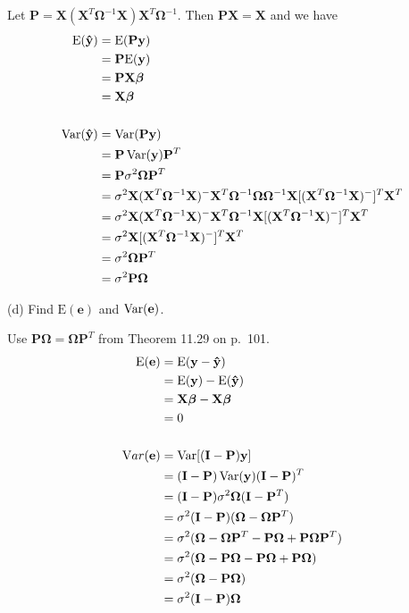 \bigskip
\noindent
Let $\mathbf P=\mathbf X(\mathbf X^T\bm\Omega^{-1}\mathbf X)\mathbf X^T
\bm\Omega^{-1}$.
Then $\mathbf{PX}=\mathbf X$ and we have
%
\begin{align*}
\mathrm E(\mathbf{\hat y})
&=\mathrm E(\mathbf{Py})\\
&=\mathbf P\mathrm E(\mathbf y)\\
&=\mathbf{PX}\bm\beta\\
&=\mathbf X\bm\beta\\
\\
\mathop{\rm Var}(\mathbf{\hat y})
&=\mathop{\rm Var}(\mathbf{Py})\\
&=\mathbf P\mathop{\rm Var}(\mathbf y)\mathbf P^T\\
&=\mathbf P\sigma^2\bm\Omega\mathbf P^T\\
&=\sigma^2\mathbf X(\mathbf X^T\bm\Omega^{-1}\mathbf X)^{-{}}
\mathbf X^T\bm\Omega^{-1}\bm\Omega\bm\Omega^{-1}
\mathbf X[(\mathbf X^T\bm\Omega^{-1}\mathbf X)^{-{}}]^T
\mathbf X^T\\
&=\sigma^2\mathbf X(\mathbf X^T\bm\Omega^{-1}\mathbf X)^{-{}}
\mathbf X^T\bm\Omega^{-1}\mathbf X[(\mathbf X^T\bm\Omega^{-1}
\mathbf X)^{-{}}]^T\mathbf X^T\\
&=\sigma^2\mathbf X[(\mathbf X^T\bm\Omega^{-1}
\mathbf X)^{-{}}]^T\mathbf X^T\\
&=\sigma^2\bm\Omega\mathbf P^T\\
&=\sigma^2\mathbf P\bm\Omega
\end{align*}

\bigskip
\noindent
(d) Find $\mathrm E(\mathbf e)$ and $\mathop{\rm Var}(\mathbf e)$.

\bigskip
\noindent
Use $\mathbf P\bm\Omega=\bm\Omega\mathbf P^T$ from Theorem 11.29
on p.\ 101.
\begin{align*}
\mathrm E(\mathbf e)
&=\mathrm E(\mathbf y-\mathbf{\hat y})\\
&=\mathrm E(\mathbf y)-\mathrm E(\mathbf{\hat y})\\
&=\mathbf X\bm\beta-\mathbf X\bm\beta\\
&=0\\
\\
\mathop{\mathrm Var}(\mathbf e)
&=\mathop{\rm Var}[(\mathbf I-\mathbf P)\mathbf y]\\
&=(\mathbf I-\mathbf P)\mathop{\rm Var}(\mathbf y)
(\mathbf I-\mathbf P)^T\\
&=(\mathbf I-\mathbf P)\sigma^2\bm\Omega
(\mathbf I-\mathbf P^T)\\
&=\sigma^2(\mathbf I-\mathbf P)(\bm\Omega-\bm\Omega\mathbf P^T)\\
&=\sigma^2(\bm\Omega-\bm\Omega\mathbf P^T
-\mathbf P\bm\Omega+\mathbf P\bm\Omega\mathbf P^T)\\
&=\sigma^2(\bm\Omega-\mathbf P\bm\Omega
-\mathbf P\bm\Omega+\mathbf P\bm\Omega)\\
&=\sigma^2(\bm\Omega-\mathbf P\bm\Omega)\\
&=\sigma^2(\mathbf I-\mathbf P)\bm\Omega
\end{align*}

